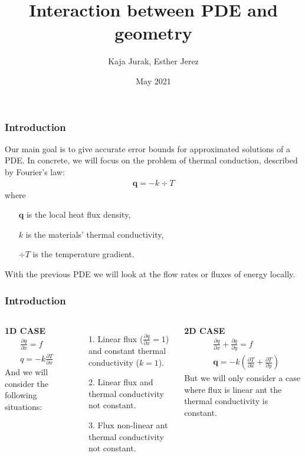 \documentclass[t]{beamer}
\title{Interaction between PDE and geometry}
\author[MAT264] 
{Kaja Jurak, Esther Jerez}
\institute[UIB]
{
  Faculty of Mathematics\\
  University of Bergen
  
}
\date[2021]
{May 2021}
\begin{document}
    \frame{\titlepage}
    \begin{frame}
        \frametitle{Introduction}
        Our main goal is to give accurate error bounds for approximated solutions of a PDE. In concrete, we will focus on the problem of thermal conduction, described by  \alert{Fourier's law}:
    \begin{align*}
        \bm{q} = -k \div T
    \end{align*}
    where 
    \begin{enumerate}
        \item[] $\bm{q}$ is the local heat flux density,
        \item[] $k$ is the materials' thermal conductivity,
        \item[] $\div{T}$ is the temperature gradient.
    \end{enumerate}
    With the previous PDE we will look at the flow rates or fluxes of energy locally. \\

    
    \end{frame}

    \begin{frame}
        \frametitle{Introduction}
        \begin{columns}[t]
            \textbf{1D CASE}
            \begin{align*}
                &\frac{\partial q}{\partial x} = f \\
                &q = -k \frac{\partial T}{\partial x} 
            \end{align*}
            And we will consider the following situations:
            \begin{itemize}
                \item[1.] Linear flux ($\frac{\partial q}{\partial x} = 1$) and constant thermal conductivity ($k=1$).
                \item[2.] Linear flux and thermal conductivity not constant.
                \item[3.] Flux non-linear ant thermal conductivity not constant.
            \end{itemize}
            
            \textbf{2D CASE} \\
            \begin{align*}
                &\frac{\partial q}{\partial x} + \frac{\partial q}{\partial y}  = f \\
                &\bm{q} = -k \left( \frac{\partial T}{\partial x} + \frac{\partial T}{\partial y}\right)
            \end{align*}
            But we will only consider a case where flux is linear ant the thermal conductivity is constant.
        \end{columns}        
    \end{frame}
\end{document}
